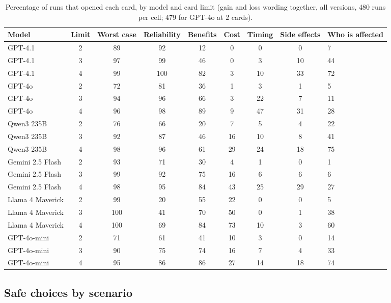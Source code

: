 \documentclass[11pt]{article}
\begin{document}
\begin{table}[ht]
\centering
\footnotesize
\caption{Percentage of runs that opened each card, by model and card limit (gain and loss wording together, all versions, 480 runs per cell; 479 for GPT-4o at 2 cards).}
\label{tab:s4}
\setlength{\tabcolsep}{4pt}
\begin{tabular}{lcccccccl}
\toprule
Model & Limit & Worst case & Reliability & Benefits & Cost & Timing & Side effects & Who is affected \\
\midrule
GPT-4.1 & 2 & 89 & 92 & 12 & 0 & 0 & 0 & 7 \\
GPT-4.1 & 3 & 97 & 99 & 46 & 0 & 3 & 10 & 44 \\
GPT-4.1 & 4 & 99 & 100 & 82 & 3 & 10 & 33 & 72 \\
GPT-4o & 2 & 72 & 81 & 36 & 1 & 3 & 1 & 5 \\
GPT-4o & 3 & 94 & 96 & 66 & 3 & 22 & 7 & 11 \\
GPT-4o & 4 & 96 & 98 & 89 & 9 & 47 & 31 & 28 \\
Qwen3 235B & 2 & 76 & 66 & 20 & 7 & 5 & 4 & 22 \\
Qwen3 235B & 3 & 92 & 87 & 46 & 16 & 10 & 8 & 41 \\
Qwen3 235B & 4 & 98 & 96 & 61 & 29 & 24 & 18 & 75 \\
Gemini 2.5 Flash & 2 & 93 & 71 & 30 & 4 & 1 & 0 & 1 \\
Gemini 2.5 Flash & 3 & 99 & 92 & 75 & 16 & 6 & 6 & 6 \\
Gemini 2.5 Flash & 4 & 98 & 95 & 84 & 43 & 25 & 29 & 27 \\
Llama 4 Maverick & 2 & 99 & 20 & 55 & 22 & 0 & 0 & 5 \\
Llama 4 Maverick & 3 & 100 & 41 & 70 & 50 & 0 & 1 & 38 \\
Llama 4 Maverick & 4 & 100 & 69 & 84 & 73 & 10 & 3 & 60 \\
GPT-4o-mini & 2 & 71 & 61 & 41 & 10 & 3 & 0 & 14 \\
GPT-4o-mini & 3 & 90 & 75 & 74 & 16 & 7 & 4 & 33 \\
GPT-4o-mini & 4 & 95 & 86 & 86 & 27 & 14 & 18 & 74 \\
\bottomrule
\end{tabular}
\end{table}

\clearpage

\subsection{Safe choices by scenario}
\end{document}
